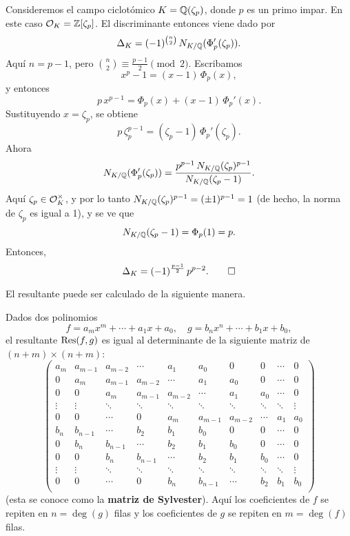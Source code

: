 \begin{ejemplo}
  \label{ejemplo:discriminante-de-Q-zeta-p}
  Consideremos el campo ciclotómico $K = \mathbb{Q} (\zeta_p)$, donde $p$ es un primo
  impar. En este caso $\mathcal{O}_K = \mathbb{Z} [\zeta_p]$. El discriminante entonces viene
  dado por
  $$\Delta_K = (-1)^{{n \choose 2}}\,N_{K/\mathbb{Q}} (\Phi_p' (\zeta_p)).$$
  Aquí $n = p-1$, pero ${n \choose 2} \equiv \frac{p-1}{2} \pmod{2}$.
  Escribamos
  $$x^p - 1 = (x-1)\,\Phi_p (x),$$
  y entonces
  $$p\,x^{p-1} = \Phi_p (x) + (x-1)\,\Phi_p' (x).$$
  Sustituyendo $x = \zeta_p$, se obtiene
  $$p\,\zeta_p^{p-1} = (\zeta_p - 1)\,\Phi_p' (\zeta_p).$$
  Ahora
  \[ N_{K/\mathbb{Q}} (\Phi_p' (\zeta_p)) =
     \frac{p^{p-1} \, N_{K/\mathbb{Q}} (\zeta_p)^{p-1}}{N_{K/\mathbb{Q}} (\zeta_p - 1)}. \]
  Aquí $\zeta_p \in \mathcal{O}_K^\times$, y por lo tanto
  $N_{K/\mathbb{Q}} (\zeta_p)^{p-1} = (\pm 1)^{p-1} = 1$
  (de hecho, la norma de $\zeta_p$ es igual a 1), y se ve que
  $$N_{K/\mathbb{Q}} (\zeta_p - 1) = \Phi_p (1) = p.$$
  Entonces,
  \[ \Delta_K = (-1)^{\frac{p-1}{2}} \, p^{p-2}. \qedhere \]
\end{ejemplo}

El resultante puede ser calculado de la siguiente manera.

\begin{proposicion}
  \label{prop:determinante-de-sylvester}
  Dados dos polinomios
  \[ f = a_m x^m + \cdots + a_1 x + a_0, \quad
     g = b_n x^n + \cdots + b_1 x + b_0, \]
  el resultante $\operatorname{Res} (f,g)$ es igual al determinante de la siguiente matriz
  de $(n+m) \times (n+m)$:
  \[ \begin{pmatrix}
    a_m & a_{m-1} & a_{m-2} & \cdots & a_1 & a_0 & 0 & 0 & \cdots & 0 \\
    0 & a_m & a_{m-1} & a_{m-2} & \cdots & a_1 & a_0 & 0 & \cdots & 0 \\
    0 & 0 & a_m & a_{m-1} & a_{m-2} & \cdots & a_1 & a_0 & \cdots & 0 \\
    \vdots & \vdots & \ddots & \ddots & \ddots & \ddots & \ddots & \ddots & \ddots & \vdots \\
    0 & 0 & \cdots & 0 & a_m & a_{m-1} & a_{m-2} & \cdots & a_1 & a_0 \\
    b_n & b_{n-1} & \cdots & b_2 & b_1 & b_0 & 0 & 0 & \cdots & 0 \\
    0 & b_n & b_{n-1} & \cdots & b_2 & b_1 & b_0 & 0 & \cdots & 0 \\
    0 & 0 & b_n & b_{n-1} & \cdots & b_2 & b_1 & b_0 & \cdots & 0 \\
    \vdots & \vdots & \ddots & \ddots & \ddots & \ddots & \ddots & \ddots & \ddots & \vdots \\
    0 & 0 & \cdots & 0 & b_n & b_{n-1} & \cdots & b_2 & b_1 & b_0 \\
  \end{pmatrix} \]
  (esta se conoce como la \textbf{matriz de Sylvester}). Aquí los coeficientes
  de $f$ se repiten en $n = \deg (g)$ filas y los coeficientes de $g$
  se repiten en $m = \deg (f)$ filas.
\end{proposicion}

